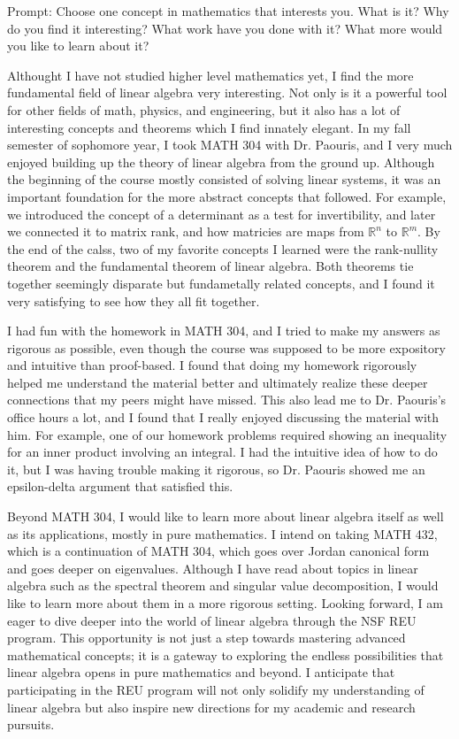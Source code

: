 \documentclass{article}
\begin{document}
\noindent Prompt: 
Choose one concept in mathematics that interests you. 
What is it? Why do you find it interesting? What work have you done with it? What more would you like to learn about it?

\vspace{5mm}

Althought I have not studied higher level mathematics yet, I find the more fundamental field of linear algebra very interesting.
Not only is it a powerful tool for other fields of math, physics, and engineering, but it also has a lot of interesting concepts and theorems which I find innately elegant.
In my fall semester of sophomore year, I took MATH 304 with Dr. Paouris, and I very much enjoyed building up the theory of linear algebra from the ground up.
Although the beginning of the course mostly consisted of solving linear systems, it was an important foundation for the more abstract concepts that followed.
For example, we introduced the concept of a determinant as a test for invertibility, and later we connected it to matrix rank, and how matricies are maps from \(\mathbb{R}^n\) to \(\mathbb{R}^m\).
By the end of the calss, two of my favorite concepts I learned were the rank-nullity theorem and the fundamental theorem of linear algebra.
Both theorems tie together seemingly disparate but fundametally related concepts, and I found it very satisfying to see how they all fit together.

I had fun with the homework in MATH 304, and I tried to make my answers as rigorous as possible, even though the course was supposed to be more expository and intuitive than proof-based.
I found that doing my homework rigorously helped me understand the material better and ultimately realize these deeper connections that my peers might have missed.
This also lead me to Dr. Paouris's office hours a lot, and I found that I really enjoyed discussing the material with him.
For example, one of our homework problems required showing an inequality for an inner product involving an integral.
I had the intuitive idea of how to do it, but I was having trouble making it rigorous, so Dr. Paouris showed me an epsilon-delta argument that satisfied this.

Beyond MATH 304, I would like to learn more about linear algebra itself as well as its applications, mostly in pure mathematics.
I intend on taking MATH 432, which is a continuation of MATH 304, which goes over Jordan canonical form and goes deeper on eigenvalues.
Although I have read about topics in linear algebra such as the spectral theorem and singular value decomposition, I would like to learn more about them in a more rigorous setting.
Looking forward, I am eager to dive deeper into the world of linear algebra through the NSF REU program. This opportunity is not just a step towards mastering advanced mathematical concepts; it is a gateway to exploring the endless possibilities that linear algebra opens in pure mathematics and beyond. I anticipate that participating in the REU program will not only solidify my understanding of linear algebra but also inspire new directions for my academic and research pursuits.
\end{document}
